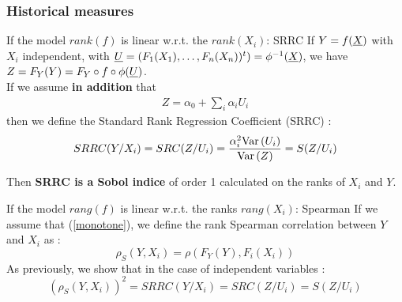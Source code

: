 \documentclass[8pt]{beamer}
\begin{document}
 
 
 

\begin{frame}
\frametitle{Historical measures}
 \small
  
 \begin{block}{If the model $rank(f)$ is  linear w.r.t. the $rank(X_i)$: SRRC}
   If $Y = f({\underline{X}})$ with \alert{$X_i$ independent}, with ${\underline{U}} = (F_1(X_1), \dots, F_n(X_n))^t) = \phi^{-1}({\underline{X}})$, we have $ Z = F_Y(Y) = F_Y \circ f \circ \phi ({\underline{U}})$. \\
   

 If we assume  {\bf in addition} that
    \alert{\begin{align}\label{monotone}
           Z = \alpha_0 +\sum_i \alpha_i U_i
           \end{align}
           }
       then we define the  \alert{ Standard Rank Regression Coefficient (SRRC)} :
          $$
     SRRC(Y/X_i) = SRC(Z / U_i) = \dfrac{\alpha_i^2 \mbox{Var}\left( U_i \right)}{\mbox{Var}\left( Z \right)} = S(Z/U_i)
    $$    
       
    Then {\bf SRRC is a Sobol indice} of order 1 calculated on the ranks of $X_i$ and $Y$.
           
  \end{block} 

   
 \begin{block}{If the model $rang(f)$ is  linear w.r.t. the ranks $rang(X_i)$: Spearman}
  If we assume that (\ref{monotone}), we define the \alert{ rank Spearman correlation} between $Y$ and $X_i$ as :
  $$
 \rho_S(Y,X_i) = \rho(F_Y(Y),F_i(X_i))
  $$
  As previously, we show that in the case of  \alert{independent variables} :
  $$
  (\rho_S(Y,X_i))^2 = SRRC(Y/X_i) = SRC(Z / U_i) = S(Z/U_i)
  $$
 
\end{block}
 \end{frame}
\end{document}
